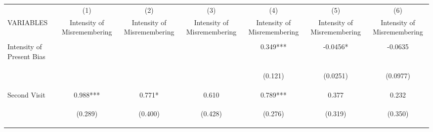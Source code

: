 \begin{center}
\begin{tabular}{lcccccc} \hline
 & (1) & (2) & (3) & (4) & (5) & (6) \\
VARIABLES & Intensity of Misremembering & Intensity of Misremembering & Intensity of Misremembering & Intensity of Misremembering & Intensity of Misremembering & Intensity of Misremembering \\ \hline
\vspace{4pt} & \begin{footnotesize}\end{footnotesize} & \begin{footnotesize}\end{footnotesize} & \begin{footnotesize}\end{footnotesize} & \begin{footnotesize}\end{footnotesize} & \begin{footnotesize}\end{footnotesize} & \begin{footnotesize}\end{footnotesize} \\
Intensity of Present Bias &  &  &  & 0.349*** & -0.0456* & -0.0635 \\
\vspace{4pt} & \begin{footnotesize}\end{footnotesize} & \begin{footnotesize}\end{footnotesize} & \begin{footnotesize}\end{footnotesize} & \begin{footnotesize}(0.121)\end{footnotesize} & \begin{footnotesize}(0.0251)\end{footnotesize} & \begin{footnotesize}(0.0977)\end{footnotesize} \\
Second Visit & 0.988*** & 0.771* & 0.610 & 0.789*** & 0.377 & 0.232 \\
\vspace{4pt} & \begin{footnotesize}(0.289)\end{footnotesize} & \begin{footnotesize}(0.400)\end{footnotesize} & \begin{footnotesize}(0.428)\end{footnotesize} & \begin{footnotesize}(0.276)\end{footnotesize} & \begin{footnotesize}(0.319)\end{footnotesize} & \begin{footnotesize}(0.350)\end{footnotesize} \\

\end{tabular}
\end{center}
